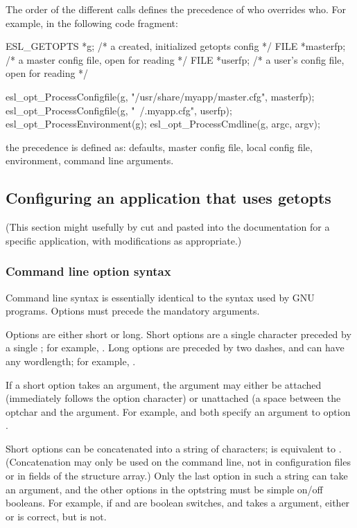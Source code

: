 The order of the different  calls defines the
precedence of who overrides who. For example, in the following code
fragment:

\begin{cchunk}
   ESL_GETOPTS *g;        /* a created, initialized getopts config  */
   FILE *masterfp;        /* a master config file, open for reading */
   FILE *userfp;          /* a user's config file, open for reading */

   esl_opt_ProcessConfigfile(g, "/usr/share/myapp/master.cfg", masterfp);
   esl_opt_ProcessConfigfile(g, "~/.myapp.cfg",                userfp);
   esl_opt_ProcessEnvironment(g);
   esl_opt_ProcessCmdline(g, argc, argv);
\end{cchunk}

the precedence is defined as: defaults, master config file, local
config file, environment, command line arguments. 


\subsection{Configuring an application that uses getopts}

(This section might usefully by cut and pasted into the documentation
for a specific application, with modifications as appropriate.)

   \subsubsection{Command line option syntax}

Command line syntax is essentially identical to the syntax used by GNU
programs. Options must precede the mandatory arguments.

Options are either short or long. Short options are a single character
preceded by a single \ccode{-}; for example, . Long options
are preceded by two dashes, and can have any wordlength; for example,
.

If a short option takes an argument, the argument may either be
attached (immediately follows the option character) or unattached (a
space between the optchar and the argument. For example, 
and  both specify an argument  to option
.

Short options can be concatenated into a string of characters;
 is equivalent to . (Concatenation may
only be used on the command line, not in configuration files or in
fields of the  structure array.) Only the last
option in such a string can take an argument, and the other options in
the optstring must be simple on/off booleans. For example, if
 and  are boolean switches, and  takes a
 argument, either  or 
is correct, but  is not.

